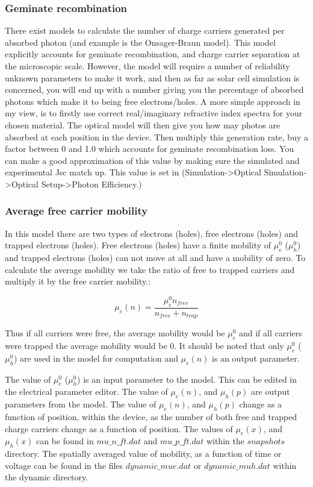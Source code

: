 \subsubsection{Geminate recombination}
There exist models to calculate the number of charge carriers generated per absorbed photon (and example is the Onsager-Braun model).  This model explicitly accounts for geminate recombination, and charge carrier separation at the microscopic scale.  However, the model will require a number of reliability unknown parameters to make it work, and then as far as solar cell simulation is concerned, you will end up with a number giving you the percentage of absorbed photons which make it to being free electrons/holes.  A more simple approach in my view, is to firstly use correct real/imaginary refractive index spectra for your chosen material.  The optical model will then give you how may photos are absorbed at each position in the device.  Then multiply this generation rate, buy a factor between 0 and 1.0 which accounts for geminate recombination loss.  You can make a good approximation of this value by making sure the simulated and experimental Jsc match up.  This value is set in (Simulation->Optical Simulation->Optical Setup->Photon Efficiency.)



\subsubsection{Average free carrier mobility}
In this model there are two types of electrons (holes), free electrons (holes) and trapped electrons (holes).  Free electrons (holes) have a finite mobility of $\mu_e^0$ ($\mu_h^0$) and trapped electrons (holes) can not move at all and have a mobility of zero.  To calculate the average mobility we take the ratio of free to trapped carriers and multiply it by the free carrier mobility.:

\begin{equation}
\mu_e(n)=\frac{\mu_e^0 n_{free}}{n_{free}+n_{trap}}
\end{equation}

Thus if all carriers were free, the average mobility would be $\mu_e^0$ and if all carriers were trapped the average mobility would be 0.  It should be noted that only $\mu_e^0$ ($\mu_h^0$) are used in the model for computation and $\mu_e(n)$ is an output parameter.

The value of $\mu_e^0$ ($\mu_h^0$) is an input parameter to the model.  This can be edited in the electrical parameter editor.  The value of $\mu_e(n)$, and $\mu_h(p)$ are output parameters from the model.  The value of $\mu_e(n)$, and $\mu_h(p)$ change as a function of position, within the device, as the number of both free and trapped charge carriers change as a function of position.  The values of  $\mu_e(x)$, and $\mu_h(x)$ can be found in $mu\_n\_ft.dat$ and $mu\_p\_ft.dat$ within the $snapshots$ directory.  The spatially averaged value of mobility, as a function of time or voltage can be found in the files $dynamic\_mue.dat$ or $dynamic\_muh.dat$ within the dynamic directory.

